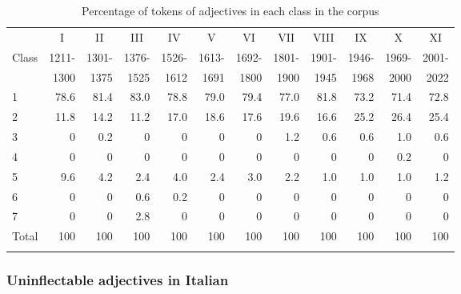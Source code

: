 \documentclass[output=paper,colorlinks,citecolor=brown]{langscibook}
\begin{document}
\begin{table}
	\centering
	\begin{tabularx}{0.85\textwidth}{lrrrrrrrrrrr}
		\lsptoprule
			\multicolumn{1}{r}{\hspace{0.5cm}Period} & \multicolumn{1}{c}{I} & \multicolumn{1}{c}{II} & \multicolumn{1}{c}{III} & \multicolumn{1}{c}{IV} & \multicolumn{1}{c}{V} & \multicolumn{1}{c}{VI} & \multicolumn{1}{c}{VII} & \multicolumn{1}{c}{VIII} & \multicolumn{1}{c}{IX} & \multicolumn{1}{c}{X} & \multicolumn{1}{c}{XI} \\
			\multicolumn{1}{l}{Class} & 1211- & 1301- & 1376- & 1526- & 1613- & 1692- & 1801- & 1901- & 1946- & 1969- & 2001- \\
			& 1300 & 1375 & 1525 & 1612 & 1691 & 1800 & 1900 & 1945 & 1968 & 2000 & 2022 \\
			\midrule
			1 & 78.6 & 81.4 & 83.0 & 78.8 & 79.0 & 79.4 & 77.0 & 81.8 & 73.2 & 71.4 & 72.8 \\
			2 & 11.8 & 14.2 & 11.2 & 17.0 & 18.6 & 17.6 & 19.6 & 16.6 & 25.2 & 26.4 & 25.4 \\
			3 & 0 & 0.2 & 0 & 0 & 0 & 0 & 1.2 & 0.6 & 0.6 & 1.0 & 0.6 \\
			4 & 0 & 0 & 0 & 0 & 0 & 0 & 0 & 0 & 0 & 0.2 & 0 \\
			5 & 9.6 & 4.2 & 2.4 & 4.0 & 2.4 & 3.0 & 2.2 & 1.0 & 1.0 & 1.0 & 1.2 \\
			6 & 0 & 0 & 0.6 & 0.2 & 0 & 0 & 0 & 0 & 0 & 0 & 0 \\
			7 & 0 & 0 & 2.8 & 0 & 0 & 0 & 0 & 0 & 0 & 0 & 0 \\
			Total & 100 & 100 & 100 & 100 & 100 & 100 & 100 & 100 & 100 & 100 & 100 \\
		\lspbottomrule
	\end{tabularx}
	\caption{Percentage of tokens of adjectives in each class in the corpus}
	\label{10tab16}
\end{table}

\subsubsection{Uninflectable adjectives in Italian}

\largerpage[1.5]
\end{document}
